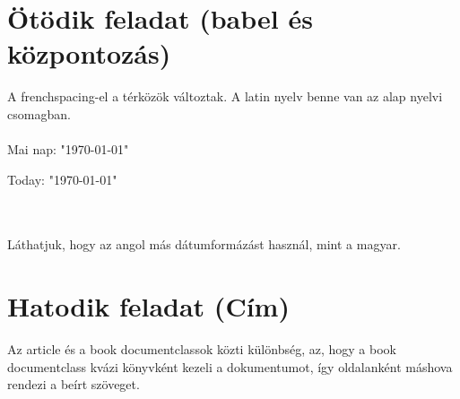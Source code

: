 \documentclass{book}
\begin{document}
\section{Ötödik feladat (babel és központozás)}
	A frenchspacing-el a térközök változtak. A latin nyelv benne van az alap nyelvi csomagban.\\\\
	Mai nap: "\today"\\
	\begin{otherlanguage}{english}
		Today: "\today"
	\end{otherlanguage}\\\\
	Láthatjuk, hogy az angol más dátumformázást használ, mint a magyar.
\section{Hatodik feladat (Cím)}
	Az article és a book documentclassok közti különbség, az, hogy a book documentclass kvázi könyvként kezeli a dokumentumot, így oldalanként máshova rendezi a beírt szöveget.
\end{document}

